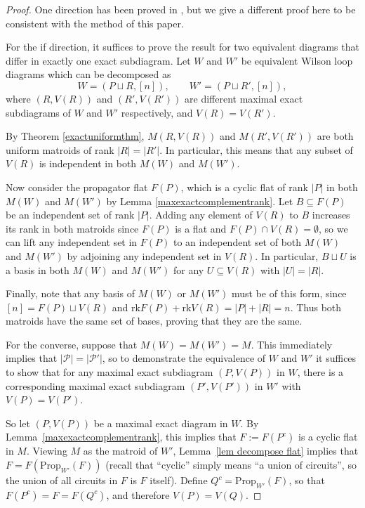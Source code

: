 \documentclass[11pt]{article}
\newcommand{\rk}{\textrm{rk} }
\newcommand{\cP}{\mathcal{P}}
\newcommand{\Prop}{\textrm{Prop}}
\theoremstyle{remark}
\theoremstyle{definition}
\begin{document}
\begin{proof}One direction has been proved in \cite[Theorem 1.18]{wilsonloop}, but we give a different proof here to be consistent with the method of this paper. 

For the if direction, it suffices to prove the result for two equivalent diagrams that differ in exactly one exact subdiagram. Let $W$ and $W'$ be equivalent Wilson loop diagrams which can be decomposed as
\[W = (P \sqcup R, [n]), \qquad W' = (P \sqcup R', [n]),\]
where $(R,V(R))$ and $(R',V(R'))$ are different maximal exact subdiagrams of $W$ and $W'$ respectively, and $V(R) = V(R')$. 

By Theorem \ref{exactuniformthm}, $M(R, V(R))$ and $M(R',V(R'))$ are both uniform matroids of rank $|R| = |R'|$. In particular, this means that any subset of $V(R)$ is independent in both $M(W)$ and $M(W')$.

Now consider the propagator flat $F(P)$, which is a cyclic flat of rank $|P|$ in both $M(W)$ and $M(W')$ by Lemma \ref{maxexactcomplementrank}. Let $B \subseteq F(P)$ be an independent set of rank $|P|$. Adding any element of $V(R)$ to $B$ increases its rank in both matroids since $F(P)$ is a flat and $F(P) \cap V(R) = \emptyset$, so we can lift any independent set in $F(P)$ to an independent set of both $M(W)$ and $M(W')$ by adjoining any independent set in $V(R)$. In particular, $B\sqcup U$ is a basis in both $M(W)$ and $M(W')$ for any $U \subseteq V(R)$ with $|U| = |R|$.

Finally, note that any basis of $M(W)$ or $M(W')$ must be of this form, since $[n] = F(P) \sqcup V(R)$ and $\rk F(P) + \rk V(R) = |P| + |R| = n$. Thus both matroids have the same set of bases, proving that they are the same.

For the converse, suppose that $M(W) = M(W') = M$. This immediately implies that $|\cP| = |\cP'|$, so to demonstrate the equivalence of $W$ and $W'$ it suffices to show that for any maximal exact subdiagram $(P,V(P))$ in $W$, there is a corresponding maximal exact subdiagram $(P',V(P'))$ in $W'$ with $V(P) = V(P')$.

So let $(P,V(P))$ be a maximal exact diagram in $W$. By Lemma~\ref{maxexactcomplementrank}, this implies that $F:=F(P^c)$ is a cyclic flat in $M$. Viewing $M$ as the matroid of $W'$, Lemma~\ref{lem decompose flat} implies that $F = F(\Prop_{W'}(F))$ (recall that ``cyclic'' simply means ``a union of circuits'', so the union of all circuits in $F$ is $F$ itself). Define $Q^c = \Prop_{W'}(F)$, so that $F(P^c) = F = F(Q^c)$, and therefore $V(P) = V(Q)$.


\end{proof}
\end{document}
